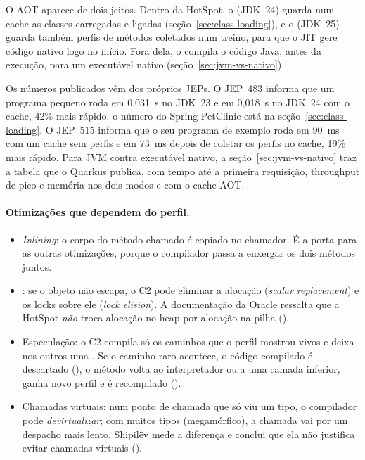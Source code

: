 O AOT aparece de dois jeitos. Dentro da HotSpot, o
 (JDK~24) guarda num cache as classes carregadas e
ligadas (seção~\ref{sec:class-loading}), e o 
(JDK~25) guarda também perfis de métodos coletados num treino, para que o
JIT gere código nativo logo no início. Fora dela, o
 compila o código Java, antes da
execução, para um executável nativo (seção~\ref{sec:jvm-vs-nativo}).

Os números publicados vêm dos próprios JEPs. O JEP~483 informa que um
programa pequeno roda em 0,031~s no JDK~23 e em 0,018~s no JDK~24 com o
cache, 42\% mais rápido; o número do Spring PetClinic está na
seção~\ref{sec:class-loading}. O JEP~515 informa que o seu programa de
exemplo roda em 90~ms com um cache sem perfis e em 73~ms depois de
coletar os perfis no cache, 19\% mais rápido. Para JVM contra executável
nativo, a seção~\ref{sec:jvm-vs-nativo} traz a tabela que o Quarkus
publica, com tempo até a primeira requisição, throughput de pico e
memória nos dois modos e com o cache AOT.

\paragraph{Otimizações que dependem do perfil.}
\begin{itemize}
\item \emph{Inlining}: o corpo do método chamado é copiado no chamador.
  É a porta para as outras otimizações, porque o compilador passa a
  enxergar os dois métodos juntos.
\item {}: se o objeto não
  escapa, o C2 pode eliminar a alocação (\emph{scalar replacement}) e os
  locks sobre ele (\emph{lock elision}). A documentação da Oracle
  ressalta que a HotSpot \emph{não} troca alocação no heap por alocação
  na pilha ().
\item Especulação: o C2 compila só os caminhos que o perfil mostrou
  vivos e deixa nos outros uma . Se o caminho raro acontece, o
  código compilado é descartado
  (), o método volta
  ao interpretador ou a uma camada inferior, ganha novo perfil e é
  recompilado ().
\item Chamadas virtuais: num ponto de chamada que só viu um tipo, o
  compilador pode \emph{devirtualizar}; com muitos tipos (megamórfico),
  a chamada vai por um despacho mais lento. Shipilëv mede a diferença e
  conclui que ela não justifica evitar chamadas virtuais
  ().
\end{itemize}

